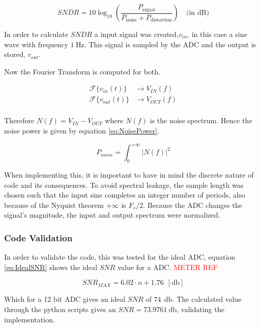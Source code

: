 \begin{equation}
    SNDR = 10 \log_{10} \left( \frac{P_{\text{signal}}}{P_{\text{noise}} + P_{\text{distortion}}} \right)  \quad \text{(in dB)}
    \label{eq:SNDR}
\end{equation}

In order to calculate $SNDR$ a input signal was created,$v_{in}$, in this case a sine wave with frequency $\SI{1}{\hertz}$. This signal is sampled by the ADC and the output is stored, $v_{out}$.

Now the Fourier Transform is computed for both.

\begin{equation}
    \begin{split}
        \mathcal{F}\{v_{in}(t)\} &\rightarrow V_{IN}(f)\\
        \mathcal{F}\{v_{out}(t)\} &\rightarrow V_{OUT}(f)\\
    \end{split}
    \label{eq:fourier}
\end{equation}

Therefore $N(f) = V_{IN} - V_{OUT}$ where $N(f)$ is the noise spectrum. Hence the noise power is given by equation \ref{eq:NoisePower}.

\begin{equation}
    P_{noise} = \int_{0}^{+\infty}|N(f)|^2 
    \label{eq:NoisePower}
\end{equation}

When implementing this, it is important to have in mind the discrete nature of code and its consequences. To avoid spectral leakage, the sample length was chosen such that the input sine completes an integer number of periods, also because of the Nyquist theorem $+\infty$ is $F_s/2$. Because the ADC changes the signal's magnitude, the input and output spectrum were normalized.

\subsubsection{Code Validation}

In order to validate the code, this was tested for the ideal ADC, equation \ref{eq:IdealSNR} shows the ideal $SNR$ value for a ADC. \textcolor{red}{METER REF}

\begin{equation}
    SNR_{MAX} = 6.02\cdot n+1.76~~[\si{\decibel}]
    \label{eq:IdealSNR}
\end{equation}

Which for a 12 bit ADC gives an ideal $SNR$ of $74~~\si{\decibel}$. The calculated value through the python scripts gives an $SNR = 73.9761~\si{\decibel}$, validating the implementation.

